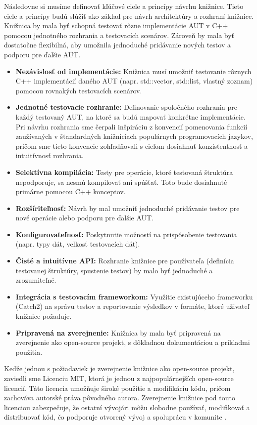 \documentclass[11pt]{article}
\begin{document}
Následovne si musíme definovať kľúčové ciele a princípy návrhu knižnice. Tieto ciele a princípy budú slúžiť ako základ pre návrh architektúry a rozhraní knižnice. Knižnica by mala byť schopná testovať rôzne implementácie AUT v C++ pomocou jednotného rozhrania a testovacích scenárov. Zároveň by mala byť dostatočne flexibilná, aby umožnila jednoduché pridávanie nových testov a podporu pre ďalšie AUT.

\begin{itemize}
    \item \textbf{Nezávislosť od implementácie:} Knižnica musí umožniť testovanie rôznych C++ implementácií daného AUT (napr. std::vector, std::list, vlastný zoznam) pomocou rovnakých testovacích scenárov.
    \item \textbf{Jednotné testovacie rozhranie:} Definovanie spoločného rozhrania pre každý testovaný AUT, na ktoré sa budú mapovať konkrétne implementácie. Pri návrhu rozhrania sme čerpali inšpiráciu z konvencií pomenovania funkcií zaužívaných v štandardných knižniciach populárnych programovacích jazykov, pričom sme tieto konvencie zohľadňovali s cieľom dosiahnuť konzistentnosť a intuitívnosť rozhrania.
    \item \textbf{Selektívna kompilácia:} Testy pre operácie, ktoré testovaná štruktúra nepodporuje, sa nesmú kompilovať ani spúšťať. Toto bude dosiahnuté primárne pomocou C++ konceptov.
    \item \textbf{Rozšíriteľnosť:} Návrh by mal umožniť jednoduché pridávanie testov pre nové operácie alebo podporu pre ďalšie AUT.
    \item \textbf{Konfigurovateľnosť:} Poskytnutie možností na prispôsobenie testovania (napr. typy dát, veľkosť testovacích dát).
    \item \textbf{Čisté a intuitívne API:} Rozhranie knižnice pre používateľa (definícia testovanej štruktúry, spustenie testov) by malo byť jednoduché a zrozumiteľné.
    \item \textbf{Integrácia s testovacím frameworkom:} Využitie existujúceho frameworku (Catch2) na správu testov a reportovanie výsledkov v formáte, ktoré uživateľ knižnice požaduje.
    \item \textbf{Pripravená na zverejnenie:} Knižnica by mala byť pripravená na zverejnenie ako open-source projekt, s dôkladnou dokumentáciou a príkladmi použitia.
\end{itemize}

Keďže jednou s požiadaviek je zverejnenie knižnice ako open-source projekt, zaviedli sme Licenciu MIT, ktorá je jednou z najpopulárnejších open-source licencií. Táto licencia umožňuje široké použitie a modifikáciu kódu, pričom zachováva autorské práva pôvodného autora. Zverejnenie knižnice pod touto licenciou zabezpečuje, že ostatní vývojári môžu slobodne používať, modifikovať a distribuovať kód, čo podporuje otvorený vývoj a spoluprácu v komunite \cite{mit_license}.
\end{document}
